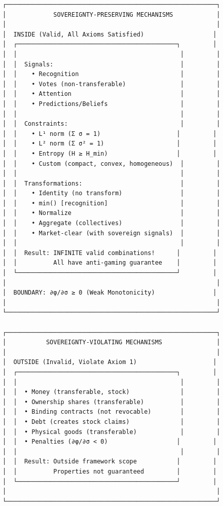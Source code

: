 \documentclass[11pt,a4paper]{article}
\theoremstyle{definition}
\theoremstyle{remark}
\begin{document}
\begin{center}
\begin{verbatim}
┌──────────────────────────────────────────────────────────┐
│             SOVEREIGNTY-PRESERVING MECHANISMS            │
│                                                          │
│  INSIDE (Valid, All Axioms Satisfied)                   │
│  ┌────────────────────────────────────────────┐         │
│  │                                             │         │
│  │  Signals:                                   │         │
│  │    • Recognition                            │         │
│  │    • Votes (non-transferable)               │         │
│  │    • Attention                              │         │
│  │    • Predictions/Beliefs                    │         │
│  │                                             │         │
│  │  Constraints:                               │         │
│  │    • L¹ norm (Σ σ = 1)                     │         │
│  │    • L² norm (Σ σ² = 1)                    │         │
│  │    • Entropy (H ≥ H_min)                   │         │
│  │    • Custom (compact, convex, homogeneous)  │         │
│  │                                             │         │
│  │  Transformations:                           │         │
│  │    • Identity (no transform)                │         │
│  │    • min() [recognition]                    │         │
│  │    • Normalize                              │         │
│  │    • Aggregate (collectives)                │         │
│  │    • Market-clear (with sovereign signals)  │         │
│  │                                             │         │
│  │  Result: INFINITE valid combinations!      │         │
│  │          All have anti-gaming guarantee    │         │
│  └────────────────────────────────────────────┘         │
│                                                          │
│  BOUNDARY: ∂φ/∂σ ≥ 0 (Weak Monotonicity)                │
│                                                          │
└──────────────────────────────────────────────────────────┘

┌──────────────────────────────────────────────────────────┐
│           SOVEREIGNTY-VIOLATING MECHANISMS               │
│                                                          │
│  OUTSIDE (Invalid, Violate Axiom 1)                     │
│  ┌────────────────────────────────────────────┐         │
│  │                                             │         │
│  │  • Money (transferable, stock)              │         │
│  │  • Ownership shares (transferable)          │         │
│  │  • Binding contracts (not revocable)        │         │
│  │  • Debt (creates stock claims)              │         │
│  │  • Physical goods (transferable)            │         │
│  │  • Penalties (∂φ/∂σ < 0)                   │         │
│  │                                             │         │
│  │  Result: Outside framework scope           │         │
│  │          Properties not guaranteed         │         │
│  └────────────────────────────────────────────┘         │
│                                                          │
└──────────────────────────────────────────────────────────┘
\end{verbatim}
\end{center}
\end{document}
